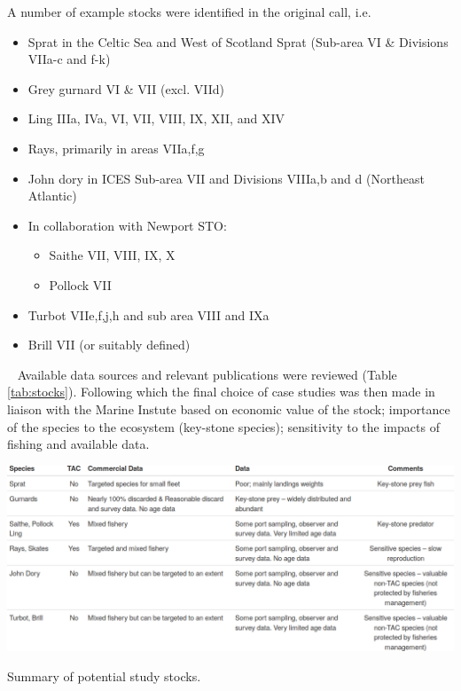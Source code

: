 A number of example stocks were identified in the original call, i.e.  

\begin{itemize}[labelindent=\parindent,noitemsep,topsep=0pt,parsep=0pt,partopsep=0pt]
 \item Sprat in the Celtic Sea and West of Scotland Sprat (Sub-area VI \& Divisions VIIa-c and f-k)
 \item Grey gurnard VI \& VII (excl. VIId)
 \item Ling IIIa, IVa, VI, VII, VIII, IX, XII, and XIV 
 \item Rays, primarily in areas VIIa,f,g 
 \item John dory in ICES Sub-area VII and Divisions VIIIa,b and d (Northeast Atlantic)
 \item In collaboration with Newport STO:
\begin{itemize} 
 \item Saithe VII, VIII, IX, X
 \item Pollock VII
\end{itemize}
\item Turbot VIIe,f,j,h and sub area VIII and IXa
\item Brill VII (or suitably defined)
\end{itemize}

~\newline
Available data sources and relevant publications were reviewed (Table \ref{tab:stocks}). Following which the final choice of case studies was then made in liaison with the Marine Instute based on economic value of the stock; importance of the species to the ecosystem (key-stone species); sensitivity to the impacts of fishing and available data.  

\begin{table}[h!]\centering\includegraphics[width=6in]{tabs/stocks.png}\caption{Summary of potential study stocks.}\label{tab:stocks}
\end{table}
 
